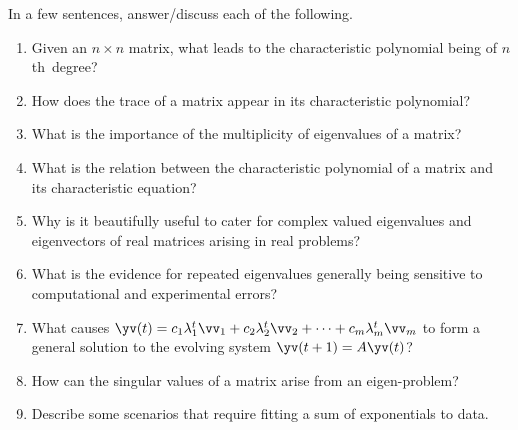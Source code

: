 











\begin{exercise} 
In a few sentences, answer\slash discuss each of the following.
\begin{enumerate}
\item  Given an \(n\times n\) matrix, what leads to the characteristic polynomial being of \(n\)th~degree?

\item How does the trace of a matrix appear in its characteristic polynomial?

\item What is the importance of the multiplicity of eigenvalues of a matrix?

\item What is the relation between the characteristic polynomial of a matrix and its characteristic equation?

\item Why is it beautifully useful to cater for complex valued eigenvalues and eigenvectors of real matrices arising in real problems?

\item What is the evidence for repeated eigenvalues generally being sensitive to computational and experimental errors?

\item What causes \(\yv(t)=c_1\lambda_1^t\vv_1+c_2\lambda_2^t\vv_2+\cdots+c_m\lambda_m^t\vv_m\) to form a general solution to the evolving system \(\yv(t+1)=A\yv(t)\)?

\item How can the singular values of a matrix arise from an eigen-problem?


\item Describe some scenarios that require fitting a sum of exponentials to data.


\end{enumerate}
\end{exercise}

